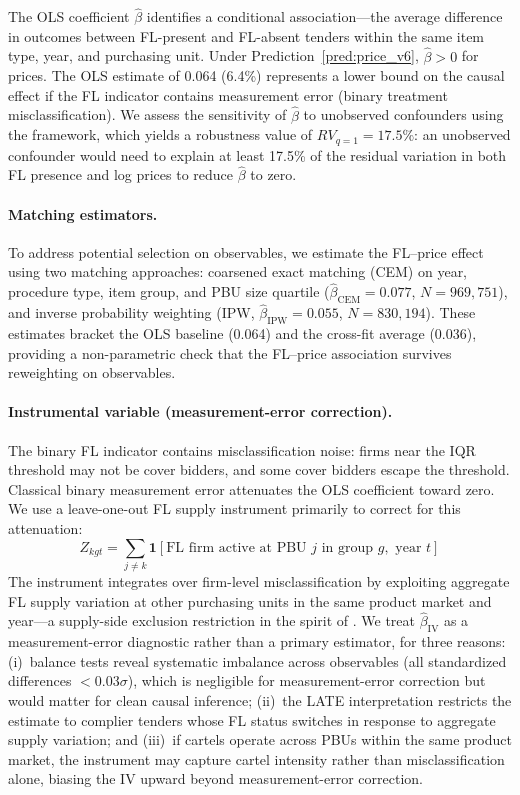 The OLS coefficient $\hat{\beta}$ identifies a conditional
association---the average difference in outcomes between FL-present and
FL-absent tenders within the same item type, year, and purchasing unit.
Under Prediction~\ref{pred:price_v6}, $\hat{\beta} > 0$ for prices. The
OLS estimate of 0.064 (6.4\%) represents a lower bound on the causal
effect if the FL indicator contains measurement error (binary treatment
misclassification). We assess the sensitivity of $\hat{\beta}$ to
unobserved confounders using the \citet{cinelli2020making} framework,
which yields a robustness value of $RV_{q=1} = 17.5\%$: an unobserved
confounder would need to explain at least 17.5\% of the residual
variation in both FL presence and log prices to reduce $\hat{\beta}$ to
zero.

\paragraph{Matching estimators.}
To address potential selection on observables, we estimate the
FL--price effect using two matching approaches: coarsened exact
matching (CEM) on year, procedure type, item group, and PBU size
quartile ($\hat{\beta}_{\text{CEM}} = 0.077$, $N = 969{,}751$), and
inverse probability weighting (IPW, $\hat{\beta}_{\text{IPW}} = 0.055$,
$N = 830{,}194$). These estimates bracket the OLS baseline (0.064)
and the cross-fit average (0.036), providing a non-parametric check
that the FL--price association survives reweighting on observables.

\paragraph{Instrumental variable (measurement-error correction).}The binary FL indicator contains misclassification noise: firms near
the IQR threshold may not be cover bidders, and some cover bidders
escape the threshold. Classical binary measurement error attenuates
the OLS coefficient toward zero. We use a leave-one-out FL supply
instrument primarily to correct for this attenuation:
\begin{equation}
  Z_{kgt} = \sum_{j \neq k} \mathbf{1}[\text{FL firm active at PBU } j
  \text{ in group } g, \text{ year } t]
  \label{eq:iv_v6}
\end{equation}
The instrument integrates over firm-level misclassification by
exploiting aggregate FL supply variation at other purchasing units in
the same product market and year---a supply-side exclusion restriction
in the spirit of \citet{goldsmithpinkham2020bartik}. We treat
$\hat{\beta}_{\text{IV}}$ as a measurement-error diagnostic rather
than a primary estimator, for three reasons: (i)~balance tests reveal
systematic imbalance across observables (all standardized differences
$< 0.03\sigma$), which is negligible for measurement-error correction
but would matter for clean causal inference; (ii)~the LATE
interpretation restricts the estimate to complier tenders whose FL
status switches in response to aggregate supply variation; and
(iii)~if cartels operate across PBUs within the same product market,
the instrument may capture cartel intensity rather than
misclassification alone, biasing the IV upward beyond
measurement-error correction.

